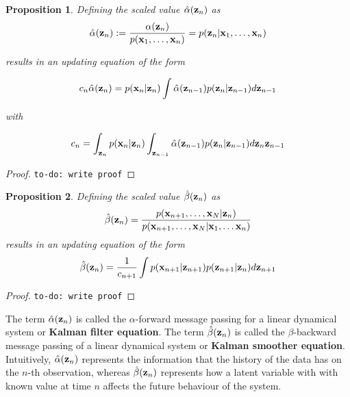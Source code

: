 \documentclass[11pt]{article}
\newtheorem{proposition}{Proposition}[section]
\begin{document}
\begin{proposition}
	Defining the scaled value $\hat\alpha({\bf z}_n)$ as
	\begin{equation}
		\hat\alpha({\bf z}_n) := \frac{\alpha({\bf z}_n)}{p({\bf x}_1, \ldots, {\bf x}_n)} = p({\bf z}_n \vert {\bf x}_1, \ldots, {\bf x}_n)
	\end{equation}
	
	results in an updating equation of the form
	
	\begin{equation}
		 c_n \hat\alpha({\bf z}_n) = p({\bf x}_n\vert{\bf z}_n)\int \hat\alpha({\bf z}_{n-1})p({\bf z}_n \vert {\bf z}_{n-1}) d{\bf z}_{n-1}
	\end{equation}
	
	with
	
	\begin{equation}
		c_n = \int_{{\bf z}_n} p({\bf x}_n \vert {\bf z}_n) \int_{{\bf z}_{n-1}} \hat\alpha({\bf z}_{n-1})p({\bf z}_n \vert {\bf z}_{n-1}) d{\bf z}_n{\bf z}_{n-1}
	\end{equation}
\end{proposition}

\begin{proof}
	\texttt{to-do: write proof}
\end{proof}

\begin{proposition}
	Defining the scaled value $\hat\beta({\bf z}_n)$ as
	\begin{equation}
		\hat\beta({\bf z}_n) = \frac{p({\bf x}_{n+1}, \ldots, {\bf x}_N \vert {\bf z}_n)}{p({\bf x}_{n+1}, \ldots, {\bf x}_N \vert {\bf x}_1, \ldots {\bf x}_n)}
	\end{equation}
	results in an updating equation of the form
	\begin{equation}
		\hat\beta({\bf z}_n) = \frac{1}{c_{n+1}}\int p({\bf x}_{n+1}\vert{\bf z}_{n+1})p({\bf z}_{n+1}\vert{\bf z}_n) d{\bf z}_{n+1}
	\end{equation}
\end{proposition}

\begin{proof}
	\texttt{to-do: write proof}
\end{proof}

The term $\hat\alpha({\bf z}_n)$ is called the $\alpha$-forward message passing for a linear dynamical system or \textbf{Kalman filter equation}.  The term $\hat\beta({\bf z}_n)$ is called the $\beta$-backward message passing of a linear dynamical system or \textbf{Kalman smoother equation}. Intuitively, $\hat\alpha({\bf z}_n)$ represents the information that the history of the data has on the $n$-th observation, whereas $\hat\beta({\bf z}_n)$ represents how a latent variable with with known value at time $n$ affects the future behaviour of the system.
\end{document}
